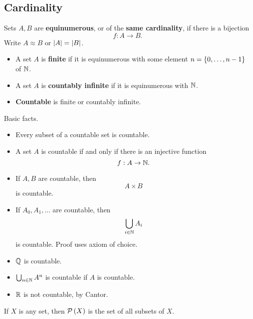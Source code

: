 \subsection{Cardinality}

\begin{definition}
Sets $ A, B $ are \textbf{equinumerous}, or of the \textbf{same cardinality}, if there is a bijection
$$ f : A \to B. $$
Write $ A \approx B $ or $ \left\lvert A \right\rvert = \left\lvert B \right\rvert $.
\end{definition}

\begin{definition}
\hfill
\begin{itemize}
\item A set $ A $ is \textbf{finite} if it is equinumerous with some element $ n = \left\{ 0, \dots, n - 1 \right\} $ of $ \mathbb{N} $.
\item A set $ A $ is \textbf{countably infinite} if it is equinumerous with $ \mathbb{N} $.
\item \textbf{Countable} is finite or countably infinite.
\end{itemize}
\end{definition}

\pagebreak

\begin{remark1}
Basic facts.
\begin{itemize}
\item Every subset of a countable set is countable.
\item A set $ A $ is countable if and only if there is an injective function
$$ f : A \to \mathbb{N}. $$
\item If $ A, B $ are countable, then
$$ A \times B $$
is countable.
\item If $ A_0, A_1, \dots $ are countable, then
$$ \bigcup_{i \in \mathbb{N}} A_i $$
is countable. Proof uses axiom of choice.
\end{itemize}
\end{remark1}

\begin{example2}
\hfill
\begin{itemize}
\item $ \mathbb{Q} $ is countable.
\item $ \bigcup_{n \in \mathbb{N}} A^n $ is countable if $ A $ is countable.
\item $ \mathbb{R} $ is not countable, by Cantor.
\end{itemize}
\end{example2}

If $ X $ is any set, then $ \mathcal{P}\left( X \right) $ is the set of all subsets of $ X $.

